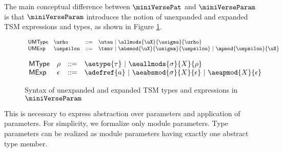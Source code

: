 \documentclass[acmlarge,review,anonymous]{acmart}\settopmatter{printfolios=true}
\begin{document}
The main conceptual difference between $\miniVersePat$ and $\miniVerseParam$ is that $\miniVerseParam$ introduces the notion of unexpanded and expanded TSM expressions and types, as shown in Figure \ref{fig:P-macro-expressions-types}. 

\begin{figure}[h]
\begin{minipage}{0.36\textwidth}
$\begin{array}{llcl}
\mathsf{UMType} & \urho & ::= & \utau ~\vert~ \allmods{\uX}{\usigma}{\urho}\\
\mathsf{UMExp} & \uepsilon & ::= & \tsmv ~\vert~ \absmod{\uX}{\usigma}{\uepsilon}~\vert~ \apmod{\uepsilon}{\uX}
\end{array}$
\end{minipage}
\begin{minipage}{0.6\textwidth}
$\begin{array}{llcl}
\mathsf{MType} & \rho & ::= & \aetype{\tau} ~\vert~ \aeallmods{\sigma}{X}{\rho} \\
\mathsf{MExp} & \epsilon & ::= & \adefref{a} ~\vert~ \aeabsmod{\sigma}{X}{\epsilon} ~\vert~\aeapmod{X}{\epsilon} 
\end{array}$
\end{minipage}
\vspace{-6px}
\caption{Syntax of unexpanded and expanded TSM types and expressions in $\miniVerseParam$}
\label{fig:P-macro-expressions-types}
\vspace{-6px}
\end{figure}
This is necessary to express abstraction over parameters and application of parameters. For simplicity, we formalize only module parameters. Type parameters can be realized as module parameters having exactly one abstract type member.
\end{document}
